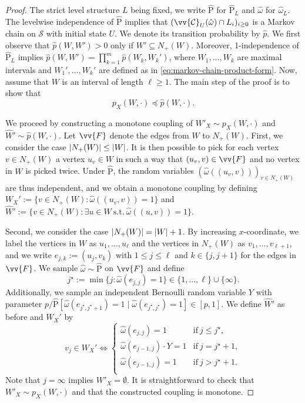 \documentclass[11pt]{article}
\renewcommand{\P}{\mathrm{P}}
\DeclarePairedDelimiter{\abs}{\lvert}{\rvert}
\theoremstyle{remark}
\begin{document}
\begin{proof}
	The strict level structure $L$ being fixed, we write $\hat{\P}$ for $\hat{\P}_L$ and $\hat{\omega}$ for $\hat{\omega}_L$. The levelwise independence of $\hat{\P}$ implies that $(\vv{\mathcal C}_U(\hat{\omega}) \cap L_i)_{i\ge 0}$ is a Markov chain on $\mathcal S$ with initial state $U$. We denote its transition probability by $\hat{p}$. We first observe that $\hat{p}(W,W')>0$ only if $W' \subseteq N_+(W)$. Moreover, 1-independence of $\hat{\P}_L$ implies $\hat{p}(W,W') = \prod_{k=1}^{m} \hat{p}(W_k,W_k')$, where $W_1,\ldots,W_k$ are maximal intervals and $W_1',\ldots,W_k'$ are defined as in \eqref{eq:markov-chain-product-form}. Now, assume that $W$ is an interval of length $\ell \ge 1$. The main step of the proof is to show that 
	\begin{equation}\label{eq:lemma-3-main-step}
		p_X(W,\boldsymbol{\cdot})\preceq \hat{p}(W,\boldsymbol{\cdot}).
	\end{equation}
	
	We proceed by constructing a monotone coupling of $W'_X \sim p_X(W,\boldsymbol{\cdot})$ and $\hat{W}' \sim \hat{p}(W,\boldsymbol{\cdot})$. Let $\vv{F}$ denote the edges from $W$ to $N_+(W)$. First, we consider the case $\abs{N_+(W)} \le \abs{W}$. It is then possible to pick for each vertex $v \in N_+(W)$ a vertex $u_v \in W$ in such a way that $(u_v,v) \in \vv{F}$ and no vertex in $W$ is picked twice. Under $\hat{\P}$, the random variables $(\hat{\omega}((u_v,v)))_{v \in N_+(W)}$ are thus independent, and we obtain a monotone coupling by defining $W_X' := \{v \in N_+(W) : \hat{\omega}((u_v,v))=1\}$ and $\hat{W}':= \{v \in N_+(W) : \exists u\in W\ \text{s.t.}\ \hat{\omega}((u,v))=1\}$.
	
	Second, we consider the case $\abs{N_+(W)} = \abs{W}+1$. By increasing $x$-coordinate, we label the vertices in $W$ as $u_1,\ldots,u_\ell$ and the vertices in $N_+(W)$ as $v_1,\ldots,v_{\ell+1}$, and we write $e_{j,k}:=(u_j,v_k)$ with $1 \le j \le \ell$ and $k\in \{j,j+1\}$ for the edges in $\vv{F}$. We sample $\hat{\omega}\sim \hat{\P}$ on $\vv{F}$  and define
	\begin{equation}
		j^\star := \min\{j: \hat{\omega}(e_{j,j})=1\} \in \{1,\ldots,\ell\} \cup \{\infty\}. 
	\end{equation}
	Additionally, we sample an independent Bernoulli random variable $Y$ with parameter $p/\hat{\P}[\hat{\omega}(e_{j^\star,j^\star+1}) = 1 \mid \hat{\omega}(e_{j^\star,j^\star})=1] \in [p,1]$. We define $\hat{W}'$ as before and $W_X'$ by
	\begin{equation}
	v_j \in W_X' \iff \begin{cases} \hat{\omega}(e_{j,j})=1 &\text{if}\ j \le j^\star, \\
		\hat{\omega}(e_{j-1,j}) \cdot Y =1 &\text{if}\ j = j^\star + 1, \\
		\hat{\omega}(e_{j-1,j}) =1 &\text{if}\ j > j^\star + 1. \\
	\end{cases} 
	\end{equation}
	Note that $j = \infty$ implies $W'_X = \emptyset$. It is straightforward to check that $W'_X \sim p_X(W,\boldsymbol{\cdot})$ and that the constructed coupling is monotone. 
	

\end{proof}
\end{document}
